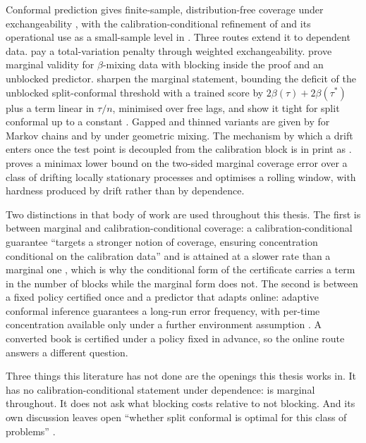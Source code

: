 \documentclass[../../../main.tex]{subfiles}
\begin{document}
Conformal prediction gives finite-sample, distribution-free coverage under exchangeability \citep{vovk2005}, with the calibration-conditional refinement of \citet[Prop.~2b, p.~479]{vovk2012} and its operational use as a small-sample level in \citet[eq.~(4), p.~2]{zwart2025}. Three routes extend it to dependent data. \citet{barber2023} pay a total-variation penalty through weighted exchangeability. \citet{oliveira2024} prove marginal validity for $\beta$-mixing data with blocking inside the proof and an unblocked predictor. \citet[Cor.~2]{barber2026} sharpen the marginal statement, bounding the deficit of the unblocked split-conformal threshold with a trained score by $2\beta(\tau)+2\beta(\tau^*)$ plus a term linear in $\tau/n$, minimised over free lags, and show it tight for split conformal up to a constant \citep[Thm.~2]{barber2026}. Gapped and thinned variants are given by \citet[Prop.~5.1, Thm.~5.1]{zheng2024} for Markov chains and by \citet{allohibi2026} under geometric mixing. The mechanism by which a drift enters once the test point is decoupled from the calibration block is in print as \citet[Prop.~13]{ramos2026}. \citet[Thm.~4]{halkiewicz2026} proves a minimax lower bound on the two-sided marginal coverage error over a class of drifting locally stationary processes and optimises a rolling window, with hardness produced by drift rather than by dependence.

Two distinctions in that body of work are used throughout this thesis. The first is between marginal and calibration-conditional coverage: a calibration-conditional guarantee ``targets a stronger notion of coverage, ensuring concentration conditional on the calibration data'' and is attained at a slower rate than a marginal one \citep{gibbs2025}, which is why the conditional form of the certificate carries a term in the number of blocks while the marginal form does not. The second is between a fixed policy certified once and a predictor that adapts online: adaptive conformal inference guarantees a long-run error frequency, with per-time concentration available only under a further environment assumption \citep[Prop.~4.1]{gibbs2021}. A converted book is certified under a policy fixed in advance, so the online route answers a different question.

Three things this literature has not done are the openings this thesis works in. It has no calibration-conditional statement under dependence: \citet{barber2026} is marginal throughout. It does not ask what blocking costs relative to not blocking. And its own discussion leaves open ``whether split conformal is optimal for this class of problems'' \citep[Sec.~4]{barber2026}.
\end{document}
